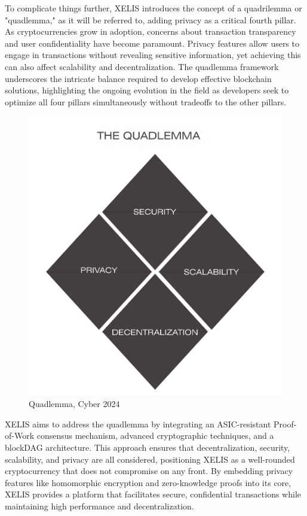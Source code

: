 \documentclass[10pt,a4paper,twocolumn]{article}
\begin{document}
To complicate things further, XELIS introduces the concept of a quadrilemma or "quadlemma," as it will be referred to, adding privacy as a critical fourth pillar. As cryptocurrencies grow in adoption, concerns about transaction transparency and user confidentiality have become paramount. Privacy features allow users to engage in transactions without revealing sensitive information, yet achieving this can also affect scalability and decentralization. The quadlemma framework underscores the intricate balance required to develop effective blockchain solutions, highlighting the ongoing evolution in the field as developers seek to optimize all four pillars simultaneously without tradeoffs to the other pillars. \\




\begin{figure}
    \centering
    \includegraphics[width=1\linewidth]{Frame 9.png}
    \caption{Quadlemma, Cyber 2024}
\end{figure}

XELIS aims to address the quadlemma by integrating an ASIC-resistant Proof-of-Work consensus mechanism, advanced cryptographic techniques, and a blockDAG architecture. This approach ensures that decentralization, security, scalability, and privacy are all considered, positioning XELIS as a well-rounded cryptocurrency that does not compromise on any front. By embedding privacy features like homomorphic encryption and zero-knowledge proofs into its core, XELIS provides a platform that facilitates secure, confidential transactions while maintaining high performance and decentralization.\\
\end{document}
